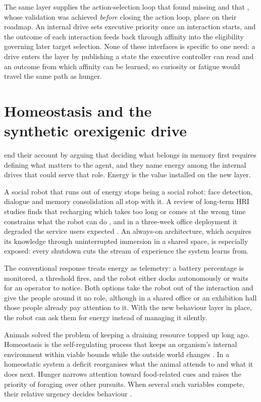 The same layer supplies the action-selection loop that \citet{Pasquali2025AlwaysOn} found missing and that \citet{Pasquali2026ISEED}, whose validation was achieved \emph{before} closing the action loop, place on their roadmap. An internal drive sets executive priority once an interaction starts, and the outcome of each interaction feeds back through affinity into the eligibility governing later target selection. None of these interfaces is specific to one need: a drive enters the layer by publishing a state the executive controller can read and an outcome from which affinity can be learned, so curiosity or fatigue would travel the same path as hunger.

\section[Homeostasis and the synthetic orexigenic drive]{Homeostasis and the\\synthetic orexigenic drive}
\label{sec:intro-homeostasis-drive}

\citet{Pasquali2025AlwaysOn} end their account by arguing that deciding what belongs in memory first requires defining what matters to the agent, and they name energy among the internal drives that could serve that role. Energy is the value installed on the new layer.

A social robot that runs out of energy stops being a social robot: face detection, dialogue and memory consolidation all stop with it. A review of long-term HRI studies finds that recharging which takes too long or comes at the wrong time constrains what the robot can do \citep{Matheus2025LongTerm}, and in a three-week office deployment it degraded the service users expected \citep{Deshmukh2018Recharging}. An always-on architecture, which acquires its knowledge through uninterrupted immersion in a shared space, is especially exposed: every shutdown cuts the stream of experience the system learns from.

The conventional response treats energy as telemetry: a battery percentage is monitored, a threshold fires, and the robot either docks autonomously or waits for an operator to notice. Both options take the robot out of the interaction and give the people around it no role, although in a shared office or an exhibition hall those people already pay attention to it. With the new behaviour layer in place, the robot can ask them for energy instead of managing it silently.

Animals solved the problem of keeping a draining resource topped up long ago. Homeostasis is the self-regulating process that keeps an organism's internal environment within viable bounds while the outside world changes \citep{Cannon1929Homeostasis}. In a homeostatic system a deficit reorganises what the animal attends to and what it does next. Hunger narrows attention toward food-related cues \citep{Petzschner2021Interoception} and raises the priority of foraging over other pursuits. When several such variables compete, their relative urgency decides behaviour \citep{Hulme2019HomeostaticControl,Rosado2022DriveCompetition}.

